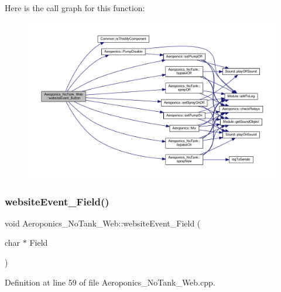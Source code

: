 Here is the call graph for this function\+:
\nopagebreak
\begin{figure}[H]
\begin{center}
\leavevmode
\includegraphics[width=350pt]{class_aeroponics___no_tank___web_a33b388e724f870482f90106fdacaa3b4_cgraph}
\end{center}
\end{figure}
\mbox{\label{class_aeroponics___no_tank___web_ad91ef49025ae421e26f39a5df527d95e}} 
\subsubsection{\texorpdfstring{website\+Event\+\_\+\+Field()}{websiteEvent\_Field()}}
{\footnotesize\ttfamily void Aeroponics\+\_\+\+No\+Tank\+\_\+\+Web\+::website\+Event\+\_\+\+Field (\begin{DoxyParamCaption}\item[{char $\ast$}]{Field }\end{DoxyParamCaption})}



Definition at line 59 of file Aeroponics\+\_\+\+No\+Tank\+\_\+\+Web.\+cpp.

